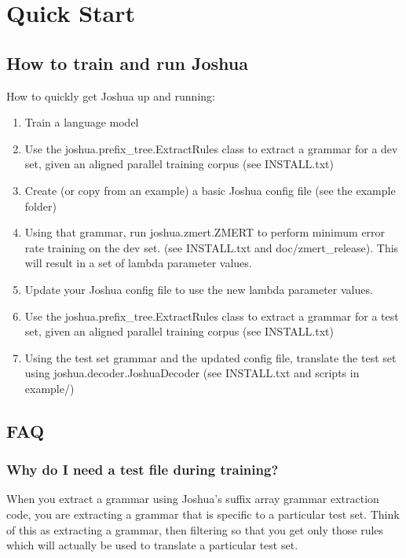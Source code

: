 \chapter{Quick Start}

\section{How to train and run Joshua}

How to quickly get Joshua up and running:

 \begin{enumerate}
 \item Train a language model
 \item Use the joshua.prefix_tree.ExtractRules class to extract a grammar for a dev set, given an aligned parallel training corpus (see INSTALL.txt)
 \item Create (or copy from an example) a basic Joshua config file (see the example folder)
 \item Using that grammar, run joshua.zmert.ZMERT to perform minimum error rate training on the dev set. (see INSTALL.txt and doc/zmert\_release). This will result in a set of lambda parameter values.
\item Update your Joshua config file to use the new lambda parameter values.
\item Use the joshua.prefix_tree.ExtractRules class to extract a grammar for a test set, given an aligned parallel training corpus (see INSTALL.txt)
\item Using the test set grammar and the updated config file, translate the test set using joshua.decoder.JoshuaDecoder (see INSTALL.txt and scripts in example/)
 \end{enumerate}


\section{FAQ}

\subsection{Why do I need a test file during training?}

When you extract a grammar using Joshua's suffix array grammar extraction code, you are extracting a grammar that is specific to a particular test set. Think of this as extracting a grammar, then filtering so that you get only those rules which will actually be used to translate a particular test set.

